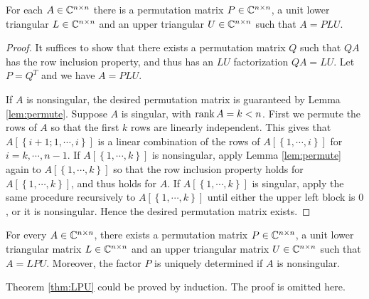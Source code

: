\documentclass[12pt]{article}
\begin{document}
\begin{theorem}
    For each \(A\in\mathbb C^{n\times n}\) there is a permutation matrix \(P\in\mathbb C^{n\times n}\), a unit lower triangular \(L\in\mathbb C^{n\times n}\) and an upper triangular \(U\in\mathbb C^{n\times n}\) such that \(A=PLU\).
\end{theorem}
\begin{proof}
    It suffices to show that there exists a permutation matrix \(Q\) such that \(QA\) has the row inclusion property, and thus has an \(LU\) factorization \(QA=LU\). Let \(P=Q^T\) and we have \(A=PLU\).\par
    If \(A\) is nonsingular, the desired permutation matrix is guaranteed by Lemma \ref{lem:permute}. Suppose \(A\) is singular, with \(\operatorname{rank} A=k<n\). First we permute the rows of \(A\) so that the first \(k\) rows are linearly independent. This gives that \(A\left[\left\{i+1;1,\cdots,i\right\}\right]\) is a linear combination of the rows of \(A\left[\left\{1,\cdots,i\right\}\right]\) for \(i=k,\cdots,n-1\). If \(A\left[\left\{1,\cdots,k\right\}\right]\) is nonsingular, apply Lemma \ref{lem:permute} again to \(A\left[\left\{1,\cdots,k\right\}\right]\) so that the row inclusion property holds for \(A\left[\left\{1,\cdots,k\right\}\right]\), and thus holds for \(A\). If \(A\left[\left\{1,\cdots,k\right\}\right]\) is singular, apply the same procedure recursively to \(A\left[\left\{1,\cdots,k\right\}\right]\) until either the upper left block is \(0\), or it is nonsingular. Hence the desired permutation matrix exists.
\end{proof}

\begin{theorem}\label{thm:LPU}
    For every \(A\in\mathbb C^{n\times n}\), there exists a permutation matrix \(P\in\mathbb C^{n\times n}\), a unit lower triangular matrix \(L\in\mathbb C^{n\times n}\) and an upper triangular matrix \(U\in\mathbb C^{n\times n}\) such that \(A=LPU\). Moreover, the factor \(P\) is uniquely determined if \(A\) is nonsingular.
\end{theorem}

Theorem \ref{thm:LPU} could be proved by induction. The proof is omitted here.
\end{document}
